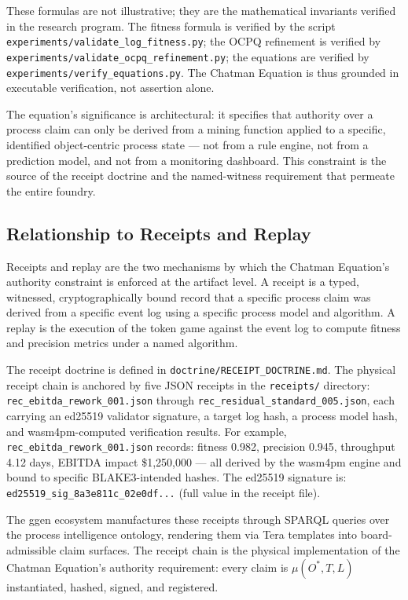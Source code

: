 These formulas are not illustrative; they are the mathematical invariants verified in the
research program. The fitness formula is verified by the script
\texttt{experiments/validate\_log\_fitness.py}; the OCPQ refinement is verified by
\texttt{experiments/validate\_ocpq\_refinement.py}; the equations are verified by
\texttt{experiments/verify\_equations.py}. The Chatman Equation is thus grounded in executable
verification, not assertion alone.

The equation's significance is architectural: it specifies that authority over a process claim
can only be derived from a mining function applied to a specific, identified object-centric
process state --- not from a rule engine, not from a prediction model, and not from a
monitoring dashboard. This constraint is the source of the receipt doctrine and the named-witness
requirement that permeate the entire foundry.

\subsection{Relationship to Receipts and Replay}
\label{sec:phd-thesis-lineage-receipts}

Receipts and replay are the two mechanisms by which the Chatman Equation's authority constraint
is enforced at the artifact level. A receipt is a typed, witnessed, cryptographically bound
record that a specific process claim was derived from a specific event log using a specific
process model and algorithm. A replay is the execution of the token game against the event log
to compute fitness and precision metrics under a named algorithm.

The receipt doctrine is defined in \texttt{doctrine/RECEIPT\_DOCTRINE.md}. The physical receipt
chain is anchored by five JSON receipts in the \texttt{receipts/} directory:
\texttt{rec\_ebitda\_rework\_001.json} through \texttt{rec\_residual\_standard\_005.json},
each carrying an ed25519 validator signature, a target log hash, a process model hash, and
wasm4pm-computed verification results. For example, \texttt{rec\_ebitda\_rework\_001.json}
records: fitness 0.982, precision 0.945, throughput 4.12 days, EBITDA impact \$1,250,000 ---
all derived by the wasm4pm engine and bound to specific BLAKE3-intended hashes. The ed25519
signature is:
\texttt{ed25519\_sig\_8a3e811c\_02e0df...} (full value in the receipt file).

The ggen ecosystem manufactures these receipts through SPARQL queries over the process
intelligence ontology, rendering them via Tera templates into board-admissible claim surfaces.
The receipt chain is the physical implementation of the Chatman Equation's authority
requirement: every claim is $\mu(O^*, T, L)$ instantiated, hashed, signed, and registered.
